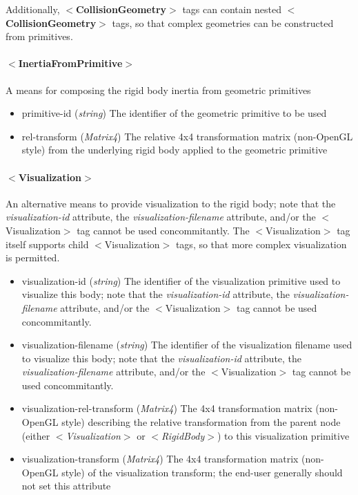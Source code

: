 \documentclass{article}
\begin{document}
\begin{landscape}
Additionally, $<$\textbf{CollisionGeometry}$>$ tags can contain nested $<$\textbf{CollisionGeometry}$>$ tags, so that complex geometries can be constructed from primitives.

\paragraph{$<$InertiaFromPrimitive$>$}
A means for composing the rigid body inertia from geometric primitives
\begin{itemize}
\item primitive-id  (\emph{string}) The identifier of the geometric primitive to be used
\item rel-transform  (\emph{Matrix4}) The relative 4x4 transformation matrix (non-OpenGL style) from the underlying rigid body applied to the geometric primitive
\end{itemize}

\paragraph{$<$Visualization$>$}
\label{section:visualization}
An alternative means to provide visualization to the rigid body; note that the \emph{visualization-id} attribute, the \emph{visualization-filename} attribute, and/or the $<$Visualization$>$ tag cannot be used concommitantly. The $<$Visualization$>$ tag itself supports child $<$Visualization$>$ tags, so that more complex visualization is permitted.

\begin{itemize}
\item visualization-id (\emph{string})  The identifier of the visualization primitive used to visualize this body; note that the \emph{visualization-id} attribute, the \emph{visualization-filename} attribute, and/or the $<$Visualization$>$ tag cannot be used concommitantly.
\item visualization-filename (\emph{string})  The identifier of the visualization filename used to visualize this body; note that the \emph{visualization-id} attribute, the \emph{visualization-filename} attribute, and/or the $<$Visualization$>$ tag cannot be used concommitantly.
\item visualization-rel-transform (\emph{Matrix4})  The 4x4 transformation matrix (non-OpenGL style) describing the relative transformation from the parent node (either $<$\emph{Visualization}$>$ or $<$\emph{RigidBody}$>$) to this visualization primitive
\item visualization-transform (\emph{Matrix4})  The 4x4 transformation matrix (non-OpenGL style) of the visualization transform; the end-user generally should not set this attribute
\end{itemize}


\end{landscape}
\end{document}
